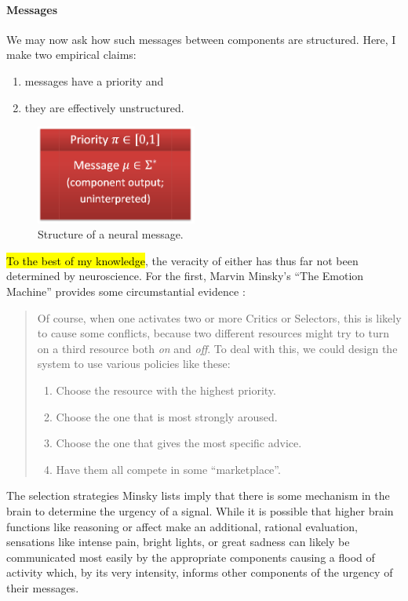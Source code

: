\documentclass[]{scrartcl}
\theoremstyle{break}
\begin{document}
\pagebreak

\paragraph{Messages}

We may now ask how such messages between components are structured. Here, I make two empirical claims:
\begin{enumerate}
	\item messages have a priority and
	\item they are effectively unstructured.
\end{enumerate}

\begin{figure}[!h]
	\centering
	\includegraphics[width=150pt]{figs/message.png}
	\caption{Structure of a neural message.}
	\label{fig:message}
\end{figure}

\hl{To the best of my knowledge}, the veracity of either has thus far not been determined by neuroscience. For the first, Marvin Minsky's ``The Emotion Machine'' provides some circumstantial evidence \cite[p. 222]{emotionMachine}:

\begin{quote}
	Of course, when one activates two or more Critics or Selectors, this is likely to cause some conflicts, because two different resources might try to turn on a third resource both {\em on} and {\em off}. To deal with this, we could design the system to use various policies like these:
	
	\begin{enumerate}
		\item Choose the resource with the highest priority.
		\item Choose the one that is most strongly aroused.
		\item Choose the one that gives the most specific advice.
		\item Have them all compete in some ``marketplace''.
	\end{enumerate}
\end{quote}

The selection strategies Minsky lists imply that there is some mechanism in the brain to determine the urgency of a signal. While it is possible that higher brain functions like reasoning or affect make an additional, rational evaluation, sensations like intense pain, bright lights, or great sadness can likely be communicated most easily by the appropriate components causing a flood of activity which, by its very intensity, informs other components of the urgency of their messages.
\end{document}
